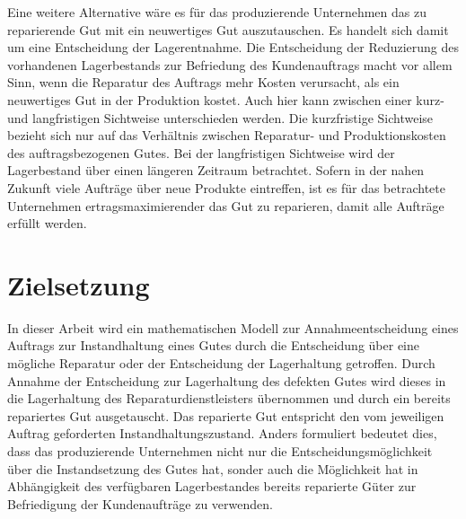 Eine weitere Alternative wäre es für das produzierende Unternehmen das zu reparierende Gut mit ein neuwertiges Gut auszutauschen. Es handelt sich damit um eine Entscheidung der Lagerentnahme. Die Entscheidung der Reduzierung des vorhandenen Lagerbestands zur Befriedung des Kundenauftrags macht vor allem Sinn, wenn die Reparatur des Auftrags mehr Kosten verursacht, als ein neuwertiges Gut in der Produktion kostet. Auch hier kann zwischen einer kurz- und langfristigen Sichtweise unterschieden werden. Die kurzfristige Sichtweise bezieht sich nur auf das Verhältnis zwischen Reparatur- und Produktionskosten des auftragsbezogenen Gutes. Bei der langfristigen Sichtweise wird der Lagerbestand über einen längeren Zeitraum betrachtet. Sofern in der nahen Zukunft viele Aufträge über neue Produkte eintreffen, ist es für das betrachtete Unternehmen ertragsmaximierender das Gut zu reparieren, damit alle Aufträge erfüllt werden.




\section{Zielsetzung}

In dieser Arbeit wird ein mathematischen Modell zur Annahmeentscheidung eines Auftrags zur Instandhaltung eines Gutes durch die Entscheidung über eine mögliche Reparatur oder der Entscheidung der Lagerhaltung getroffen. Durch Annahme der Entscheidung zur Lagerhaltung des defekten Gutes wird dieses in die Lagerhaltung des Reparaturdienstleisters übernommen und durch ein bereits repariertes Gut ausgetauscht. Das reparierte Gut entspricht den vom jeweiligen Auftrag geforderten Instandhaltungszustand. Anders formuliert bedeutet dies, dass das produzierende Unternehmen nicht nur die Entscheidungsmöglichkeit über die Instandsetzung des Gutes hat, sonder auch die Möglichkeit hat in Abhängigkeit des verfügbaren Lagerbestandes bereits reparierte Güter zur Befriedigung der Kundenaufträge zu verwenden.

